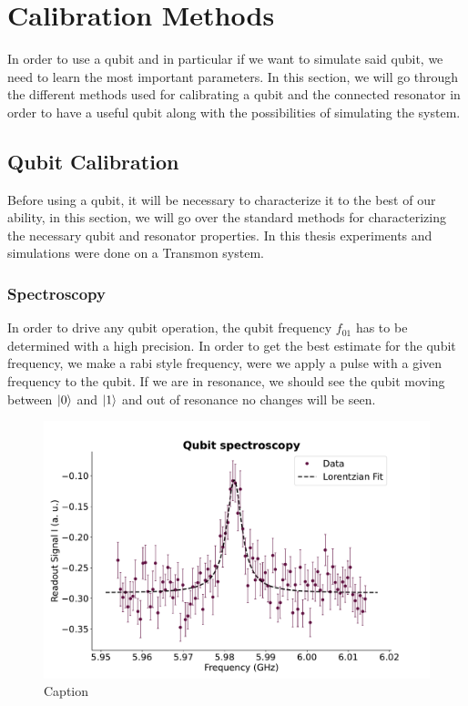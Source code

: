 \chapter{Calibration Methods}
In order to use a qubit and in particular if we want to simulate said qubit, we need to learn the most important parameters. In this section, we will go through the different methods used for calibrating a qubit and the connected resonator in order to have a useful qubit along with the possibilities of simulating the system.


\section{Qubit Calibration}
Before using a qubit, it will be necessary to characterize it to the best of our ability, in this section, we will go over the standard methods for characterizing the necessary qubit and resonator properties. In this thesis experiments and simulations were done on a Transmon system.

\subsection{Spectroscopy}
In order to drive any qubit operation, the qubit frequency $f_{01}$ has to be determined with a high precision. In order to get the best estimate for the qubit frequency, we make a rabi style frequency, were we apply a pulse with a given frequency to the qubit. If we are in resonance, we should see the qubit moving between $\ket{0}$ and $\ket{1}$ and out of resonance no changes will be seen.

\begin{figure}
    \centering
    \includegraphics{Calibrations/Figures/Qubit_spectroscopy.pdf}
    \caption{Caption}
    \label{fig:enter-label}
\end{figure}

